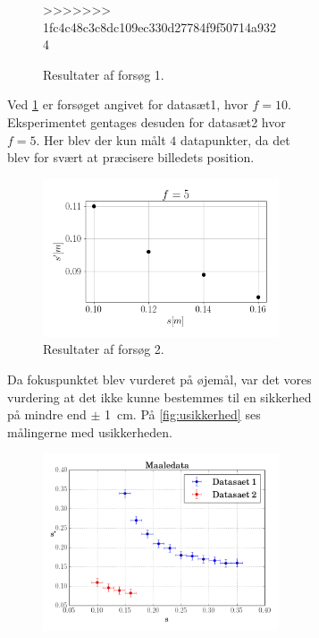 \begin{table}[H]
\begin{figure}[H]
\begin{figure}[H]
\begin{figure}[H]
    \caption{Resultater af forsøg 1.}
>>>>>>> 1fc4c48c3c8dc109ec330d27784f9f50714a9324
    \label{fig:res1}
\end{figure}
Ved \cref{fig:res1} er forsøget angivet for datasæt1, hvor $f = 10$. Eksperimentet gentages desuden for datasæt2 hvor $f = 5$. Her blev der kun målt $4$ datapunkter, da det blev for svært at præcisere billedets position.
\begin{figure}[H]
    \includegraphics[width=\linewidth]{res2.png}
    \caption{Resultater af forsøg 2.}
    \label{fig:res2}
\end{figure}
Da fokuspunktet blev vurderet på øjemål, var det vores vurdering at det ikke kunne bestemmes til en sikkerhed på mindre end $\pm $ \SI{1}{\centi\meter}. På \cref{fig:usikkerhed} ses målingerne med usikkerheden.
\begin{figure}[H]
    \includegraphics[width=\linewidth]{usikkerhed.png}

\end{figure}
\end{figure}
\end{figure}
\end{table}
